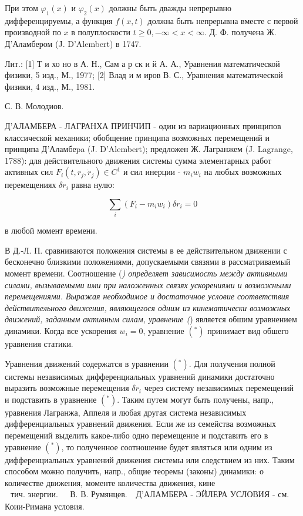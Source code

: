 \documentclass[10pt]{article}
\begin{document}
При этом $\varphi_{1}(x)$ и $\varphi_{2}(x)$ должны быть дважды непрерывно дифференцируемы, а функция $f(x, t)$ должна быть непрерывна вместе с первой производной по $x$ в полуплоскости $t \geqslant 0,-\infty<x<\infty$. Д. Ф. получена Ж. Д'Аламбером (J. D'Alembert) в 1747.



Лит.: [1] Т и хо но в А. Н., Сам а р ск и й А. А., Уравнения математической физики, 5 изд., М., 1977; [2] Влад и м иров В. С., Уравнения математической физики, 4 изд., М., 1981.



С. В. Молодиов.



Д'АЛАМБЕРА - ЛАГРАНХА ПРИНЧИП - один из вариационных принципов классической механики; обобщение принципа возможных перемещений и принципа Д'Аламбеpa (J. D'Alembert); предложен Ж. Лагранжем (J. Lagrange, 1788): для действительного движения системы сумма элементарных работ активных сил $F_{i}\left(t, r_{j}, \dot{r}_{j}\right) \in C^{1}$ и сил инерции - $m_{i} w_{i}$ на любых возможных перемещениях $\delta r_{i}$ равна нулю:



\[

\sum_{i}\left(F_{i}-m_{i} w_{i}\right) \delta r_{i}=0

\]



в любой момент времени.



В Д.-Л. П. сравниваются положения системы в ее действительном движении с бесконечно близкими положениями, допускаемыми связями в рассматриваемый момент времени. Соотношение (\textit{) определяет зависимость между активными силами, вызываемыми ими при наложенных связях ускорениями и возможными перемещениями. Выражая необходимое и достаточное условие соответствия действительного движения, являющегося одним из кинематически возможных движений, заданным активным силам, уравнение (}) является обшим уравнением динамики. Когда все ускорения $w_{i}=0$, уравнение $\left({ }^{*}\right)$ принимает вид обшего уравнения статики.



Уравнения движений содержатся в уравнении $\left({ }^{*}\right)$. Для получения полной системы независимых дифференциальных уравнений динамики достаточно выразить возможные перемещения $\delta r_{i}$ через систему независимых перемещений и подставить в уравнение $\left({ }^{*}\right)$. Таким путем могут быть получены, напр., уравнения Лагранжа, Аппеля и любая другая система независимых дифференциальных уравнений движения. Если же из семейства возможных перемещений выделить какое-либо одно перемещение и подставить его в уравнение $\left({ }^{*}\right)$, то полученное соотношение будет являться или одним из дифференциальных уравнений движения системы или следствием из них. Таким способом можно получить, напр., общие теоремы (законы) динамики: о количестве движения, моменте количества движения, кине$\begin{array}{ll}\text { тич. энергии. } & \text { В. В. Румянцев. }\end{array}$ Д'АЛАМБЕРА - ЭЙЛЕРА УСЛОВИЯ - см. Коии-Римана условия.
\end{document}

